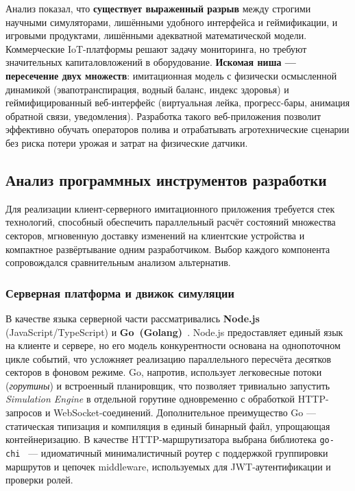 Анализ показал, что \textbf{существует выраженный разрыв} между
строгими научными симуляторами, лишёнными удобного интерфейса и
геймификации, и игровыми продуктами, лишёнными адекватной
математической модели. Коммерческие IoT-платформы решают задачу
мониторинга, но требуют значительных капиталовложений в оборудование.
\textbf{Искомая ниша --- пересечение двух множеств}: имитационная
модель с физически осмысленной динамикой (эвапотранспирация, водный
баланс, индекс здоровья) и геймифицированный веб-интерфейс (виртуальная
лейка, прогресс-бары, анимация обратной связи, уведомления). Разработка
такого веб-приложения позволит эффективно обучать операторов полива и
отрабатывать агротехнические сценарии без риска потери урожая и затрат
на физические датчики.

\subsection{Анализ программных инструментов разработки}

Для реализации клиент-серверного имитационного приложения требуется
стек технологий, способный обеспечить параллельный расчёт состояний
множества секторов, мгновенную доставку изменений на клиентские
устройства и компактное развёртывание одним разработчиком.
Выбор каждого компонента сопровождался сравнительным анализом
альтернатив.

\subsubsection{Серверная платформа и движок симуляции}

В качестве языка серверной части рассматривались \textbf{Node.js}
(JavaScript/\allowbreak TypeScript) и
\textbf{Go~(Golang)}~\cite{go_dev_official,effective_go}.
Node.js предоставляет единый язык на клиенте и сервере, но его модель
конкурентности основана на однопоточном цикле событий, что усложняет
реализацию параллельного пересчёта десятков секторов в фоновом режиме.
Go, напротив, использует легковесные потоки (\emph{горутины}) и
встроенный планировщик, что позволяет тривиально запустить
\emph{Simulation Engine} в отдельной горутине одновременно с обработкой
HTTP-запросов и WebSocket-соединений. Дополнительное преимущество
Go --- статическая типизация и компиляция в единый бинарный файл,
упрощающая контейнеризацию. В качестве HTTP-маршрутизатора выбрана
библиотека \texttt{go-chi}~\cite{go_chi_github,go_chi_pkgdev} ---
идиоматичный минималистичный роутер с поддержкой группировки
маршрутов и цепочек middleware, используемых для JWT-аутентификации и
проверки ролей.

